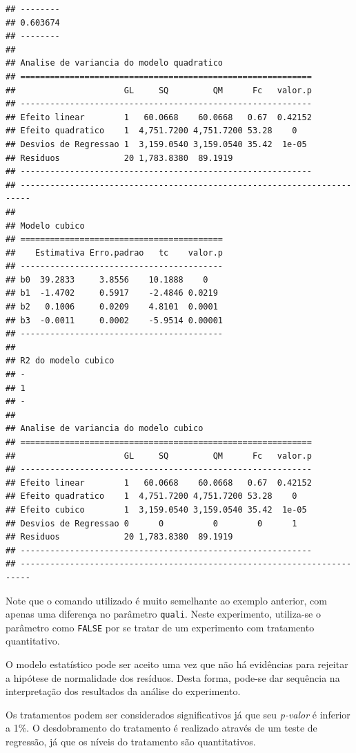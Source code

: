 \documentclass[
]{article}
\begin{document}
\begin{verbatim}
## --------
## 0.603674
## --------
## 
## Analise de variancia do modelo quadratico
## ===========================================================
##                      GL     SQ         QM      Fc   valor.p
## -----------------------------------------------------------
## Efeito linear        1   60.0668    60.0668   0.67  0.42152
## Efeito quadratico    1  4,751.7200 4,751.7200 53.28    0   
## Desvios de Regressao 1  3,159.0540 3,159.0540 35.42  1e-05 
## Residuos             20 1,783.8380  89.1919                
## -----------------------------------------------------------
## ------------------------------------------------------------------------
## 
## Modelo cubico
## =========================================
##    Estimativa Erro.padrao   tc    valor.p
## -----------------------------------------
## b0  39.2833     3.8556    10.1888    0   
## b1  -1.4702     0.5917    -2.4846 0.0219 
## b2   0.1006     0.0209    4.8101  0.0001 
## b3  -0.0011     0.0002    -5.9514 0.00001
## -----------------------------------------
## 
## R2 do modelo cubico
## -
## 1
## -
## 
## Analise de variancia do modelo cubico
## ===========================================================
##                      GL     SQ         QM      Fc   valor.p
## -----------------------------------------------------------
## Efeito linear        1   60.0668    60.0668   0.67  0.42152
## Efeito quadratico    1  4,751.7200 4,751.7200 53.28    0   
## Efeito cubico        1  3,159.0540 3,159.0540 35.42  1e-05 
## Desvios de Regressao 0      0          0        0      1   
## Residuos             20 1,783.8380  89.1919                
## -----------------------------------------------------------
## ------------------------------------------------------------------------
\end{verbatim}

Note que o comando utilizado é muito semelhante ao exemplo anterior, com apenas uma diferença no parâmetro \texttt{quali}. Neste experimento, utiliza-se o parâmetro como \texttt{FALSE} por se tratar de um experimento com tratamento quantitativo.

O modelo estatístico pode ser aceito uma vez que não há evidências para rejeitar a hipótese de normalidade dos resíduos. Desta forma, pode-se dar sequência na interpretação dos resultados da análise do experimento.

Os tratamentos podem ser considerados significativos já que seu \emph{p-valor} é inferior a 1\%. O desdobramento do tratamento é realizado através de um teste de regressão, já que os níveis do tratamento são quantitativos.
\end{document}
